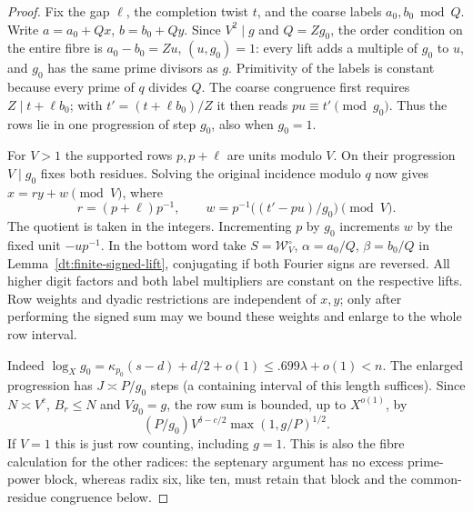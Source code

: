 \documentclass[11pt,a4paper]{article}
\theoremstyle{paperplain}
\numberwithin{equation}{section}
\begin{document}
\begin{proof}
Fix the gap $\ell$, the completion twist $t$, and the coarse labels
$a_0,b_0\bmod Q$. Write $a=a_0+Qx$, $b=b_0+Qy$. Since $V^2\mid g$
and $Q=Zg_0$, the order condition on the entire fibre is
$a_0-b_0=Zu$, $(u,g_0)=1$: every lift adds a multiple of $g_0$
to $u$, and $g_0$ has the same prime divisors as $g$.
Primitivity of the labels is constant because every prime of $q$
divides $Q$. The coarse congruence first requires $Z\mid t+\ell b_0$;
with $t'=(t+\ell b_0)/Z$ it then reads $pu\equiv t'\pmod{g_0}$.
Thus the rows lie in one progression of step $g_0$, also when $g_0=1$.

For $V>1$ the supported rows $p,p+\ell$ are units modulo $V$.
On their progression $V\mid g_0$ fixes both residues. Solving the
original incidence modulo $q$ now gives $x=ry+w\pmod V$, where
\[
 r=(p+\ell)p^{-1},\qquad w=p^{-1}\big((t'-pu)/g_0\big)\pmod V.
\]
The quotient is taken in the integers. Incrementing $p$ by $g_0$
increments $w$ by the fixed unit $-up^{-1}$. In the bottom word take
$S=\mathcal W_V^\circ$, $\alpha=a_0/Q$, $\beta=b_0/Q$ in
Lemma~\ref{dt:finite-signed-lift}, conjugating if both Fourier signs
are reversed. All higher digit factors and both label multipliers are
constant on the respective lifts. Row weights and dyadic restrictions
are independent of $x,y$; only after performing the signed sum may
we bound these weights and enlarge to the whole row interval.

Indeed $\log_X g_0=\kappa_{p_0}(s-d)+d/2+o(1)\le .699\lambda+o(1)<n$.
The enlarged progression has $J\asymp P/g_0$ steps (a containing
interval of this length suffices). Since $N\asymp V^c$, $B_r\le N$
and $Vg_0=g$, the row sum is bounded, up to $X^{o(1)}$, by
\[
 (P/g_0)V^{\delta-c/2}\max(1,g/P)^{1/2}.
\]
If $V=1$ this is just row counting, including $g=1$. This is also
the fibre calculation for the other radices: the septenary argument
has no excess prime-power block, whereas radix six, like ten, must
retain that block and the common-residue congruence below.


\end{proof}
\end{document}

